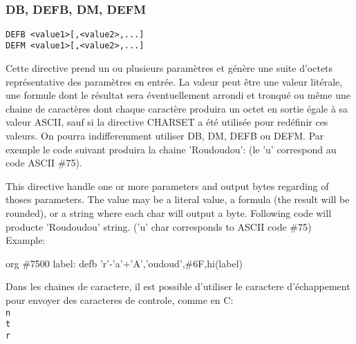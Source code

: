 \subsection{}

\subsubsection{DB, DEFB, DM, DEFM}

\begin{verbatim}
DEFB <value1>[,<value2>,...]
DEFM <value1>[,<value2>,...]
\end{verbatim}

\begin{xfr}
Cette directive prend un ou plusieurs paramètres et génère une suite d'octets représentative des paramètres en entrée. La valeur peut être une valeur litérale, une formule dont le résultat sera éventuellement arrondi et tronqué ou même une chaine de caractères dont chaque caractère produira un octet en sortie égale à sa valeur ASCII, sauf si la directive CHARSET a été utilisée pour redéfinir ces valeurs. On pourra indifferemment utiliser DB, DM, DEFB ou DEFM.
Par exemple le code suivant produira la chaine 'Roudoudou': (le 'u' correspond au code ASCII \#75).
\end{xfr}

\begin{xen}
This directive handle one or more parameters and output bytes regarding of thoses parameters. The value may be a literal value, a formula (the result will be rounded), or a string where each char will output a byte.
Following code will producte 'Roudoudou' string. ('u' char corresponds to ASCII code \#75)
Example:
\end{xen}
\begin{code}
org \#7500
label:
defb 'r'-'a'+'A','oudoud',\#6F,hi(label)
\end{code}

\begin{xfr}
Dans les chaines de caractere, il est possible d'utiliser le caractere d'échappement \\ pour envoyer des caracteres de controle, comme en C: \texttt{\\n\\t\\r}
\end{xfr}

